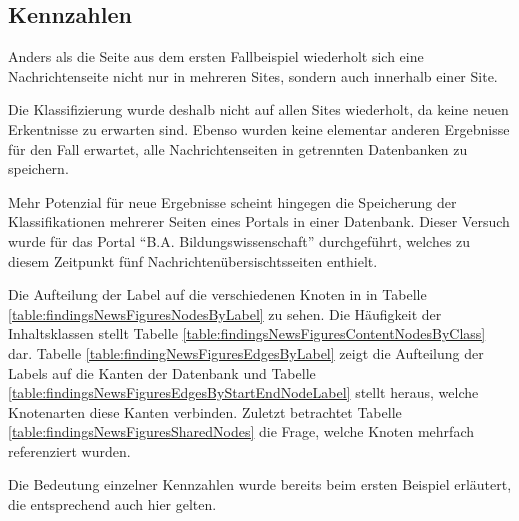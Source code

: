 \subsection{Kennzahlen}
    Anders als die Seite aus dem ersten Fallbeispiel wiederholt sich
    eine Nachrichtenseite nicht nur in mehreren Sites,
    sondern auch innerhalb einer Site.

    Die Klassifizierung wurde deshalb nicht auf allen Sites wiederholt,
    da keine neuen Erkentnisse zu erwarten sind.
    Ebenso wurden keine elementar anderen Ergebnisse für den Fall erwartet,
    alle Nachrichtenseiten in getrennten Datenbanken zu speichern.

    Mehr Potenzial für neue Ergebnisse scheint hingegen die Speicherung
    der Klassifikationen mehrerer Seiten eines Portals in einer Datenbank.
    Dieser Versuch wurde für das Portal "`B.A. Bildungswissenschaft"' durchgeführt,
    welches zu diesem Zeitpunkt fünf Nachrichtenübersischtsseiten enthielt.

    Die Aufteilung der Label auf die verschiedenen Knoten in in Tabelle
    \ref{table:findingsNewsFiguresNodesByLabel} zu sehen.
    Die Häufigkeit der Inhaltsklassen stellt Tabelle
    \ref{table:findingsNewsFiguresContentNodesByClass} dar.
    Tabelle \ref{table:findingNewsFiguresEdgesByLabel} zeigt die Aufteilung
    der Labels auf die Kanten der Datenbank und Tabelle
    \ref{table:findingsNewsFiguresEdgesByStartEndNodeLabel}
    stellt heraus, welche Knotenarten diese Kanten verbinden.
    Zuletzt betrachtet Tabelle \ref{table:findingsNewsFiguresSharedNodes}
    die Frage, welche Knoten mehrfach referenziert wurden.

    Die Bedeutung einzelner Kennzahlen wurde bereits beim ersten Beispiel erläutert,
    die entsprechend auch hier gelten.

